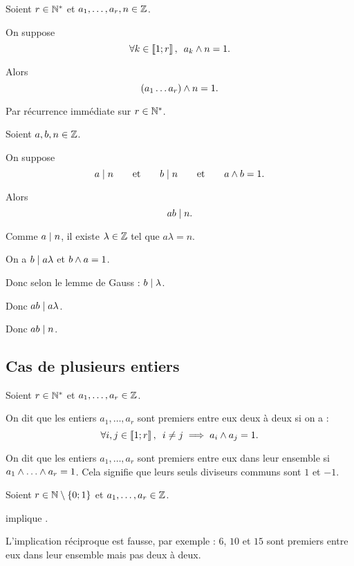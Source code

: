 \begin{cor}
Soient \(r\in\mathbb{N}^*\) et \(a_1,\dots,a_r,n\in\mathbb{Z}\).

On suppose \[\quantifs{\forall k\in\interventierii{1}{r}}a_k\et n=1.\]

Alors \[\left(a_1\dots a_r\right)\land n=1.\]
\end{cor}

\begin{dem}
Par récurrence immédiate sur \(r\in\mathbb{N}^*\).
\end{dem}

\begin{prop}
Soient \(a,b,n\in\mathbb{Z}\).

On suppose \[a\mid n\qquad\text{et}\qquad b\mid n\qquad\text{et}\qquad a\land b=1.\]

Alors \[ab\mid n.\]
\end{prop}

\begin{dem}
Comme \(a\mid n\), il existe \(\lambda\in\mathbb{Z}\) tel que \(a\lambda=n\).

On a \(b\mid a\lambda\) et \(b\land a=1\).

Donc selon le lemme de Gauss : \(b\mid\lambda\).

Donc \(ab\mid a\lambda\).

Donc \(ab\mid n\).
\end{dem}

\subsection{Cas de plusieurs entiers}

\begin{defi}
Soient \(r\in\mathbb{N}^*\) et \(a_1,\dots,a_r\in\mathbb{Z}\).

On dit que les entiers \(a_1,\dots,a_r\) sont premiers entre eux deux à deux si on a : \[\quantifs{\forall i,j\in\interventierii{1}{r}}i\not=j\imp a_i\et a_j=1.\]

On dit que les entiers \(a_1,\dots,a_r\) sont premiers entre eux dans leur ensemble si \(a_1\et\dots\et a_r=1\). Cela signifie que leurs seuls diviseurs communs sont \(1\) et \(-1\).
\end{defi}

\begin{rem}
Soient \(r\in\mathbb{N}\setminus\left\lbrace0;1\right\rbrace\) et \(a_1,\dots,a_r\in\mathbb{Z}\).

 implique .

L'implication réciproque est fausse, par exemple : \(6\), \(10\) et \(15\) sont premiers entre eux dans leur ensemble mais pas deux à deux.
\end{rem}

